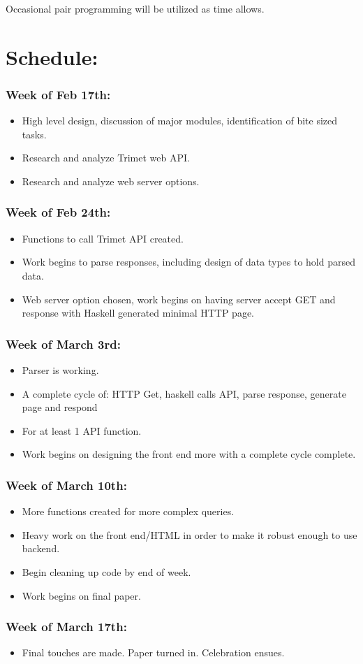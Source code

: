 \documentclass{article}
\begin{document}
Occasional pair programming will be utilized as time allows.

\section*{Schedule:}

\subsubsection*{Week of Feb 17th:}
\begin{itemize}
\item High level design, discussion of major modules, identification of bite sized tasks.
\item Research and analyze Trimet web API.
\item Research and analyze web server options.
\end{itemize}

\subsubsection*{Week of Feb 24th:}
\begin{itemize}
\item Functions to call Trimet API created.
\item Work begins to parse responses, including design of data types to hold parsed data.
\item Web server option chosen, work begins on having server accept GET and response
with Haskell generated minimal HTTP page.
\end{itemize}

\subsubsection*{Week of March 3rd:}
\begin{itemize}
\item Parser is working.
\item A complete cycle of: HTTP Get, haskell calls API, parse response, generate page and respond
\item For at least 1 API function.  
\item Work begins on designing the front end more with a complete cycle complete.
\end{itemize}

\subsubsection*{Week of March 10th:}
\begin{itemize}
\item More functions created for more complex queries.
\item Heavy work on the front end/HTML in order to make it robust enough to use backend.
\item Begin cleaning up code by end of week.
\item Work begins on final paper.
\end{itemize}

\subsubsection*{Week of March 17th:}
\begin{itemize}
\item Final touches are made.  Paper turned in.  Celebration ensues.
\end{itemize}
\end{document}
